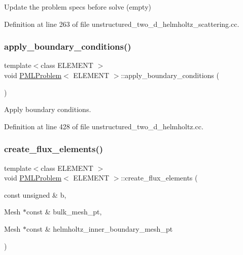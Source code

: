 Update the problem specs before solve (empty) 



Definition at line 263 of file unstructured\+\_\+two\+\_\+d\+\_\+helmholtz\+\_\+scattering.\+cc.

\mbox{\label{classPMLProblem_a2d2cdf5c1e99a7600d91353fd0584d5c}} 
\subsubsection{\texorpdfstring{apply\+\_\+boundary\+\_\+conditions()}{apply\_boundary\_conditions()}}
{\footnotesize\ttfamily template$<$class E\+L\+E\+M\+E\+NT $>$ \\
void \hyperlink{classPMLProblem}{P\+M\+L\+Problem}$<$ E\+L\+E\+M\+E\+NT $>$\+::apply\+\_\+boundary\+\_\+conditions (\begin{DoxyParamCaption}{ }\end{DoxyParamCaption})}



Apply boundary conditions. 



Definition at line 428 of file unstructured\+\_\+two\+\_\+d\+\_\+helmholtz.\+cc.

\mbox{\label{classPMLProblem_a748701cc016c2bfd07ed2d2467268b5d}} 
\subsubsection{\texorpdfstring{create\+\_\+flux\+\_\+elements()}{create\_flux\_elements()}}
{\footnotesize\ttfamily template$<$class E\+L\+E\+M\+E\+NT $>$ \\
void \hyperlink{classPMLProblem}{P\+M\+L\+Problem}$<$ E\+L\+E\+M\+E\+NT $>$\+::create\+\_\+flux\+\_\+elements (\begin{DoxyParamCaption}\item[{const unsigned \&}]{b,  }\item[{Mesh $\ast$const \&}]{bulk\+\_\+mesh\+\_\+pt,  }\item[{Mesh $\ast$const \&}]{helmholtz\+\_\+inner\+\_\+boundary\+\_\+mesh\+\_\+pt }\end{DoxyParamCaption})}



